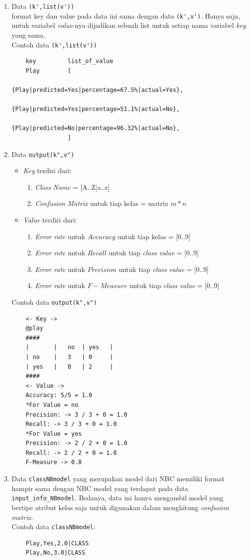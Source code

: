 \begin{enumerate}
	\item{Data \verb|(k',list(v'))|}\\
	format key dan value pada data ini sama dengan data \verb|(k',v')|. Hanya saja, untuk variabel \textit{value}-nya dijadikan sebuah list untuk setiap nama variabel \textit{key} yang sama.\\
	Contoh data \verb|(k',list(v'))|
	\begin{lstlisting}
	key			list_of_value
	Play		[
					{Play|predicted=Yes|percentage=67.5%|actual=Yes},
					{Play|predicted=Yes|percentage=51.1%|actual=No},
					{Play|predicted=No|percentage=96.32%|actual=No},
				]
	\end{lstlisting}

	\item{Data \verb|output(k",v")|}
	\begin{itemize}
		\item \textit{Key} terdiri dari:
		\begin{enumerate}
			\item \textit{Class Name} = [A..Z|a..z]
			\item \textit{Confusion Matrix} untuk tiap kelas = matrix $m*n$
		\end{enumerate}
		
		\item \textit{Value} terdiri dari:
		\begin{enumerate}
			\item \textit{Error rate} untuk $Accuracy$ untuk tiap kelas = [0..9]
			\item \textit{Error rate} untuk $Recall$ untuk tiap \textit{class value} = [0..9]
			\item \textit{Error rate} untuk $Precision$ untuk tiap \textit{class value} = [0..9]
			\item \textit{Error rate} untuk $F-Measure$ untuk tiap \textit{class value} = [0..9]
		\end{enumerate}
	\end{itemize}
	Contoh data \verb|output(k",v")|
	\begin{lstlisting}
	<- Key ->
	@play
	####
	|		|	no	| yes	|
	| no	|	3	| 0		|
	| yes	|	0	| 2		|
	####
	<- Value ->
	Accuracy: 5/5 = 1.0
	*For Value = no
	Precision: -> 3 / 3 + 0 = 1.0
	Recall: -> 3 / 3 + 0 = 1.0 
	*For Value = yes
	Precision: -> 2 / 2 + 0 = 1.0
	Recall: -> 2 / 2 + 0 = 1.0
	F-Measure -> 0.8
	\end{lstlisting}

	\item{Data \verb|classNBmodel|} yang merupakan model dari NBC memiliki format hampir sama dengan NBC model yang terdapat pada data \verb|input_info_NBmodel|. Bedanya, data ini hanya mengambil model yang bertipe atribut kelas saja untuk digunakan dalam menghitung \textit{confusion matrix}.\\
	Contoh data \verb|classNBmodel|: 
	\begin{lstlisting}
	Play,Yes,2.0|CLASS
	Play,No,3.0|CLASS
	\end{lstlisting}

\end{enumerate}


